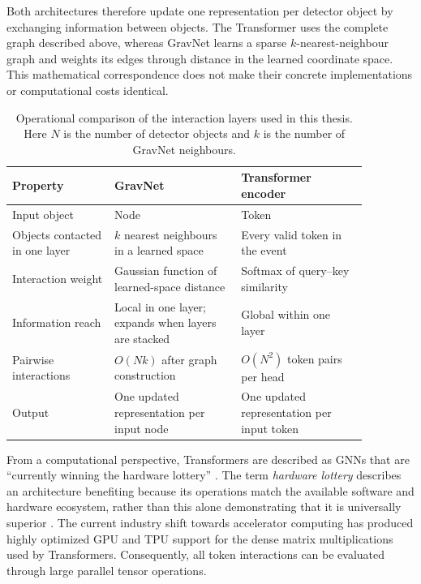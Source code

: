 Both architectures therefore update one representation per detector object by
exchanging information between objects. The Transformer uses the complete
graph described above, whereas GravNet learns a sparse \(k\)-nearest-neighbour
graph and weights its edges through distance in the learned coordinate space.
This mathematical correspondence does not make their concrete implementations
or computational costs identical.

\begin{table}[htbp]
    \centering
    \small
    \caption{Operational comparison of the interaction layers used in this
    thesis. Here \(N\) is the number of detector objects and \(k\) is the
    number of GravNet neighbours.}
    \label{tab:gravnet_transformer_comparison}
    \begin{tabular}{p{0.25\linewidth} p{0.31\linewidth} p{0.31\linewidth}}
        \hline
        Property & GravNet & Transformer encoder \\
        \hline
        Input object & Node & Token \\
        Objects contacted in one layer &
        \(k\) nearest neighbours in a learned space &
        Every valid token in the event \\
        Interaction weight &
        Gaussian function of learned-space distance &
        Softmax of query--key similarity \\
        Information reach &
        Local in one layer; expands when layers are stacked &
        Global within one layer \\
        Pairwise interactions &
        \(O(Nk)\) after graph construction &
        \(O(N^2)\) token pairs per head \\
        Output &
        One updated representation per input node &
        One updated representation per input token \\
        \hline
    \end{tabular}
\end{table}

From a computational perspective, Transformers are described as GNNs that are
``currently winning the hardware lottery'' \cite{joshi2025transformersgnn}.
The term \emph{hardware lottery} describes an architecture benefiting because
its operations match the available software and hardware ecosystem, rather
than this alone demonstrating that it is universally superior
\cite{hooker2020hardwarelottery}. The current industry shift towards
accelerator computing has produced highly optimized GPU and TPU support for
the dense matrix multiplications used by Transformers. Consequently, all
token interactions can be evaluated through large parallel tensor operations.

